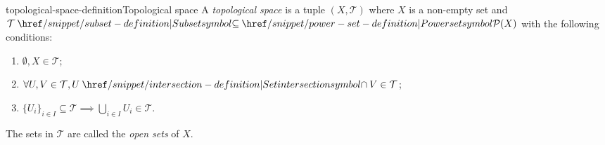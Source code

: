 \documentclass[preview]{standalone}
\begin{document}
\genpage

\begin{snippetdefinition}{topological-space-definition}{Topological space}
    A \textit{topological space} is a tuple \((X, \mathcal{T})\)
    where \(X\) is a non-empty set and \(\mathcal{T} \subseteq \powerset(X)\)
    with the following conditions:
    \begin{enumerate}
        \item \(\emptyset, X \in \mathcal{T}\);
        \item \(\forall U, V \in \mathcal{T}, U \intersection V \in \mathcal{T}\);
        \item \({\{U_i\}}_{i \in I} \subseteq \mathcal{T} \implies \bigcup_{i \in I} U_i \in \mathcal{T}\).
    \end{enumerate}
    The sets in \(\mathcal{T}\) are called the \textit{open sets} of \(X\).
\end{snippetdefinition}

\end{document}
